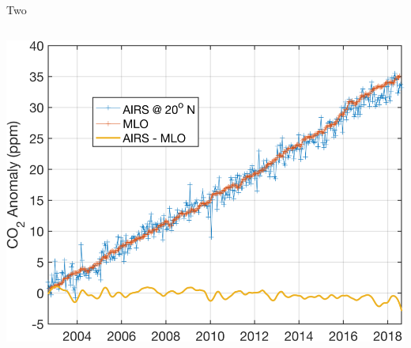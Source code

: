\documentclass[10pt,t]{beamer}
\begin{document}
\begin{frame}[label={sec:org409cb32}]{Two}
\vspace{-0.6in}
\begin{columns}
\begin{column}{0.55\columnwidth}
\begin{block}{}
\begin{center}
\includegraphics[width=\linewidth]{./Figs/airs_vs_mlo_co2_anom_jun24.png}
\end{center}
\end{block}
\end{column}
\end{columns}
\end{frame}
\end{document}
